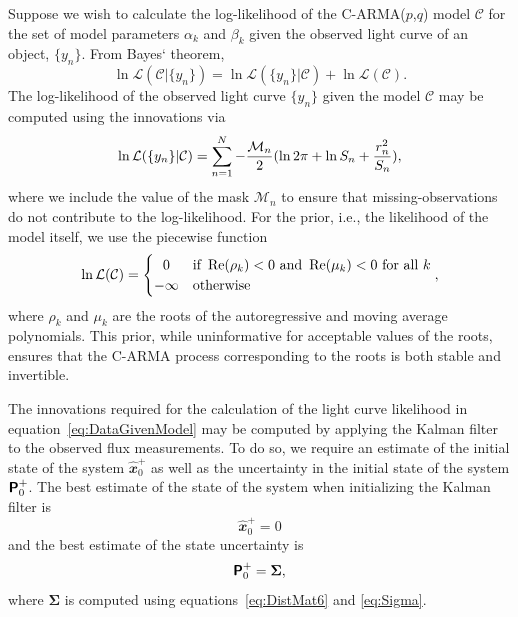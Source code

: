 \documentclass[a4paper,fleqn,usenatbib]{mnras}
\begin{document}
Suppose we wish to calculate the log-likelihood of the C-ARMA($p$,$q$) model $\mathcal{C}$ for the set of model parameters $\alpha_{k}$ and $\beta_{k}$ given the observed light curve of an object, $\{y_{n}\}$. From Bayes` theorem,
\begin{equation}\label{eq:ModelGivenData}
\ln \mathcal{L}(\mathcal{C}|\{y_{n}\}) = \ln \mathcal{L}(\{y_{n}\}|\mathcal{C}) + \ln \mathcal{L}(\mathcal{C}).
\end{equation}
The log-likelihood of the observed light curve $\{y_{n}\}$ given the model $\mathcal{C}$ may be computed using the innovations via
\begin{equation}\label{eq:DataGivenModel}
\ln \mathcal{L}(\{y_{n}\}|\mathcal{C}) = \sum_{n = 1}^{N} -\frac{\mathcal{M}_{n}}{2}(\ln 2 \pi + \ln S_{n} + \frac{r_{n}^{2}}{S_{n}}),
\end{equation}
where we include the value of the mask $\mathcal{M}_{n}$ to ensure that missing-observations do not contribute to the log-likelihood. For the prior, i.e., the likelihood of the model itself, we use the piecewise function
\begin{equation}\label{eq:Prior}
\ln \mathcal{L}(\mathcal{C}) =
  \begin{cases}
      \hfill 0    \hfill & \text{if~} \operatorname{Re}(\rho_{k}) < 0 \text{~and~} \operatorname{Re}(\mu_{k}) < 0 \text{~for all~} k  \\
      \hfill -\infty \hfill & \text{otherwise}
  \end{cases},
\end{equation}
where $\rho_{k}$ and $\mu_{k}$ are the roots of the autoregressive and moving average polynomials. This prior, while uninformative for acceptable values of the roots, ensures that the C-ARMA process corresponding to the roots is both stable and invertible.

The innovations required for the calculation of the light curve likelihood in equation~\eqref{eq:DataGivenModel} may be computed by applying the Kalman filter to the observed flux measurements. To do so, we require an estimate of the initial state of the system $\widehat{\mathbfit{x}}^{+}_{0}$ as well as the uncertainty in the initial state of the system $\textbf{\textsf{P}}^{+}_{0}$. The best estimate of the state of the system when initializing the Kalman filter is
\begin{equation}\label{eq:x0}
\widehat{\mathbfit{x}}^{+}_{0} = \mathbfit{0}
\end{equation}
and the best estimate of the state uncertainty is
\begin{equation}\label{eq:P0}
\textbf{\textsf{P}}^{+}_{0} = \boldsymbol{\Sigma},
\end{equation}
where $\boldsymbol{\Sigma}$ is computed using equations~\eqref{eq:DistMat6} and \eqref{eq:Sigma}.
\end{document}
